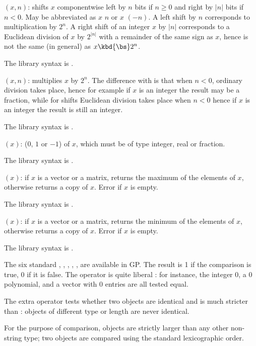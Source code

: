 $(x,n)$: \label{se:shift}shifts $x$ componentwise left by $n$ bits if $n\ge0$ and right by $|n|$
bits if $n<0$. May be abbreviated as $x$ \kbd{<<} $n$ or $x$ \kbd{>>} $(-n)$.
A left shift by $n$ corresponds to multiplication by $2^n$. A right shift of an
integer $x$ by $|n|$ corresponds to a Euclidean division of $x$ by $2^{|n|}$
with a remainder of the same sign as $x$, hence is not the same (in general) as
$x \kbd{\bs} 2^n$.

The library syntax is .

$(x,n)$: \label{se:shiftmul}multiplies $x$ by $2^n$. The difference with
 is that when $n<0$, ordinary division takes place, hence for
example if $x$ is an integer the result may be a fraction, while for shifts
Euclidean division takes place when $n<0$ hence if $x$ is an integer the result
is still an integer.

The library syntax is .

$(x)$: \label{se:sign} ($0$, $1$ or $-1$) of $x$, which must be of
type integer, real or fraction.

The library syntax is .

$(x)$: \label{se:vecmax}if $x$ is a vector or a matrix, returns the maximum
of the elements of $x$, otherwise returns a copy of $x$. Error if $x$ is
empty.

The library syntax is .

$(x)$: \label{se:vecmin}if $x$ is a vector or a matrix, returns the minimum
of the elements of $x$, otherwise returns a copy of $x$. Error if $x$ is
empty.

The library syntax is .

 The six
standard  \kbd{<=}, \kbd{<}, \kbd{>=}, \kbd{>},
\kbd{==}, \kbd{!=} are available in GP. The result is 1 if the comparison is
true, 0 if it is false. The operator \kbd{==} is quite liberal : for
instance, the integer 0, a 0 polynomial, and a vector with 0 entries are all
tested equal.

The extra operator \kbd{===} tests whether two objects are identical and is
much stricter than \kbd{==} : objects of different type or length are never
identical.


For the purpose of comparison,  objects are strictly larger than any
other non-string type; two  objects are compared using the standard
lexicographic order.

